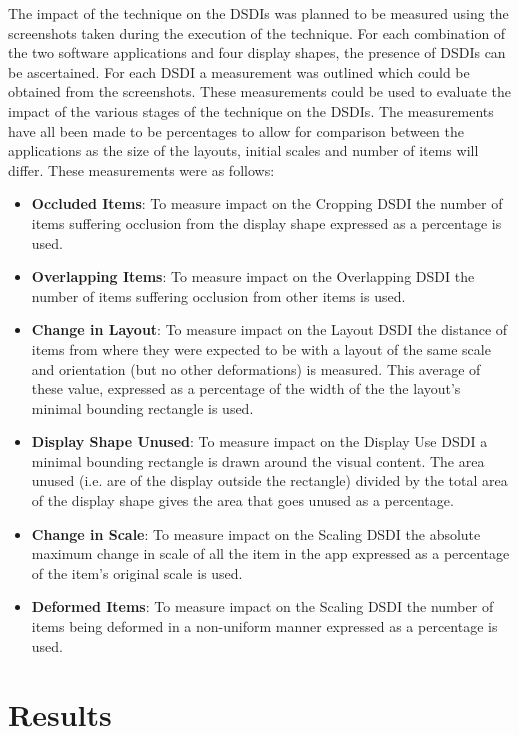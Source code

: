 \documentclass[twocolumn,compsoc]{cvm}
\begin{document}
{The impact of the technique on the \acp{DSDI} was planned to be measured using the screenshots taken during the execution of the technique.
For each combination of the two software applications and four display shapes, the presence of \acp{DSDI} can be ascertained.
For each \ac{DSDI} a measurement was outlined which could be obtained from the screenshots.
These measurements could be used to evaluate the impact of the various stages of the technique on the \acp{DSDI}.
The measurements have all been made to be percentages to allow for comparison between the applications as the size of the layouts, initial scales and number of items will differ.
These measurements were as follows:
\begin{itemize}
  \item \textbf{Occluded Items}: 
  To measure impact on the Cropping \ac{DSDI} the number of items suffering occlusion from the display shape expressed as a percentage is used.
  \item \textbf{Overlapping Items}: 
  To measure impact on the Overlapping \ac{DSDI} the number of items suffering occlusion from other items is used.  
  \item \textbf{Change in Layout}: 
  To measure impact on the Layout \ac{DSDI} the distance of items from where they were expected to be with a layout of the same scale and orientation (but no other deformations) is measured.
  This average of these value, expressed as a percentage of the width of the the layout's minimal bounding rectangle is used.
  \item \textbf{Display Shape Unused}: 
  To measure impact on the Display Use \ac{DSDI} a minimal bounding rectangle is drawn around the visual content.
  The area unused (i.e. are of the display outside the rectangle) divided by the total area of the display shape gives the area that goes unused as a percentage.
  \item \textbf{Change in Scale}: 
  To measure impact on the Scaling \ac{DSDI} the absolute maximum change in scale of all the item in the app expressed as a percentage of the item's original scale is used.
  \item \textbf{Deformed Items}: 
  To measure impact on the Scaling \ac{DSDI}  the number of items being deformed in a non-uniform manner expressed as a percentage is used.
\end{itemize}


\section{Results}
\label{sec:results}

}
\end{document}
